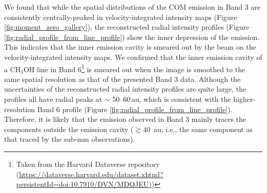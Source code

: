 \documentclass[twocolumn, twocolappendix, astrosymb, times]{aastex631}
\newcommand{\methanol}{CH$_3$OH\xspace}
\begin{document}
We found that while the spatial distributions of the COM emission in Band 3 are consistently centrally-peaked in velocity-integrated intensity maps (Figure \ref{fig:moment_zero_gallery}), the reconstructed radial intensity profiles (Figure \ref{fig:radial_profile_from_line_profile}) show the inner depression of the emission. This indicates that the inner emission cavity is smeared out by the beam on the velocity-integrated intensity maps. We confirmed that the inner emission cavity of a \methanol line in Band 6\footnote{Taken from the Harvard Dataverse repository (\url{https://dataverse.harvard.edu/dataset.xhtml?persistentId=doi:10.7910/DVN/MDQJEU)})} \citep{Tobin2023} is smeared out when the image is smoothed to the same spatial resolution as that of the presented Band 3 data.
Although the uncertainties of the reconstructed radial intensity profiles are quite large, the profiles all have radial peaks at $\sim$ 50--60\,au, which is consistent with the higher-resolution Band 6 profile (Figure \ref{fig:radial_profile_from_line_profile}). Therefore, it is likely that the emission observed in Band 3 mainly traces the components outside the emission cavity ($\gtrsim 40\,$ au, i.e., the same component as that traced by the sub-mm observations). 
\end{document}
